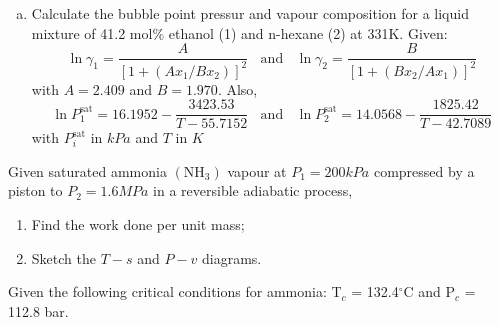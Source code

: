 \documentclass[calculator,steamtables,datasheet,solutions]{exam}
\begin{document}
\begin{question}
%
\begin{enumerate}[(a)]
\item Calculate the bubble point pressur and vapour composition for a liquid mixture of 41.2 mol$\%$ ethanol (1) and n-hexane (2) at 331K. Given:
\begin{displaymath}
\ln{\gamma_{1}} = \frac{A}{\left[1+\left(Ax_{1} / Bx_{2}\right)\right]^{2}} \;\;\text{ and }\;\; \ln{\gamma_{2}} = \frac{B}{\left[1+\left(Bx_{2} / Ax_{1}\right)\right]^{2}}
\end{displaymath}
with $A=2.409$ and $B=1.970$. Also,
\begin{displaymath}
\ln{P_{1}^{\text{sat}}} = 16.1952 - \frac{3423.53}{T-55.7152} \;\;\text{ and }\;\; \ln{P_{2}^{\text{sat}}} = 14.0568 - \frac{1825.42}{T-42.7089}
\end{displaymath}
with $P_{i}^{\text{sat}}$ in $kPa$ and $T$ in $K$ 


\end{enumerate}
\end{question}

\clearpage

\begin{question}

Given saturated ammonia $\left(\text{NH}_{3}\right)$ vapour at $P_{1} = 200 kPa$ compressed by a piston to $P_{2} = 1.6 MPa$ in a reversible adiabatic process,
\begin{enumerate}
\item Find the work done per unit mass; 
\item Sketch the $T-s$ and $P-v$ diagrams.
\end{enumerate}
Given the following critical conditions for ammonia: T$_{c}$ = 132.4$^{\circ}$C and P$_{c}$ = 112.8 bar.


\end{question}
\end{document}
